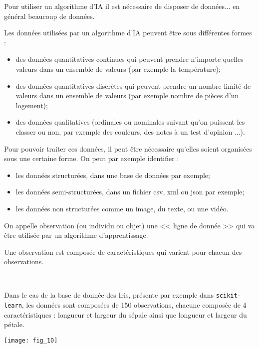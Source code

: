 Pour utiliser un algorithme d'IA il est nécessaire de disposer de données... en général beaucoup de données. 
\begin{defi}[Données]
Les données utilisées par un algorithme d'IA peuvent être sous différentes formes : 
\begin{itemize}
\item des données quantitatives continues qui peuvent prendre n'importe quelles valeurs dans un ensemble de valeurs (par exemple la température);
\item des données quantitatives discrètes qui peuvent prendre un nombre limité de valeurs dans un ensemble de valeurs (par exemple nombre de pièces d'un logement);
\item des données qualitatives (ordinales ou nominales suivant qu'on puissent les classer ou non, par exemple des couleurs, des notes à un test d'opinion ...).
\end{itemize}

\end{defi}

Pour pouvoir traiter ces données, il peut être nécessaire qu'elles soient organisées sous une certaine forme. On peut par exemple identifier : 
\begin{itemize}
\item les données structurées, dans une base de données par exemple;
\item les données semi-structurées, dans un fichier csv, xml ou json par exemple;
\item les données non structurées comme un image, du texte, ou une vidéo.
\end{itemize}

\begin{defi}

On appelle observation (ou individu ou objet) une << ligne de donnée >> qui va être utilisée par un algorithme d'apprentissage. 

Une observation est composée de caractéristiques qui varient pour chacun des observations. 
\end{defi}

\begin{exemple}~\\

\begin{minipage}[c]{.65\linewidth}
Dans le cas de la base de donnée des Iris, présente par exemple dans \texttt{scikit-learn}, les données sont composées de 150 observations, chacune composée de 4 caractéristiques : longueur et largeur du sépale ainsi que longueur et largeur du pétale.
\end{minipage} \hfill
\begin{minipage}[c]{.3\linewidth}
\begin{center}
\texttt{[image: fig\_10]}
\end{center}
\end{minipage} 

\end{exemple}


